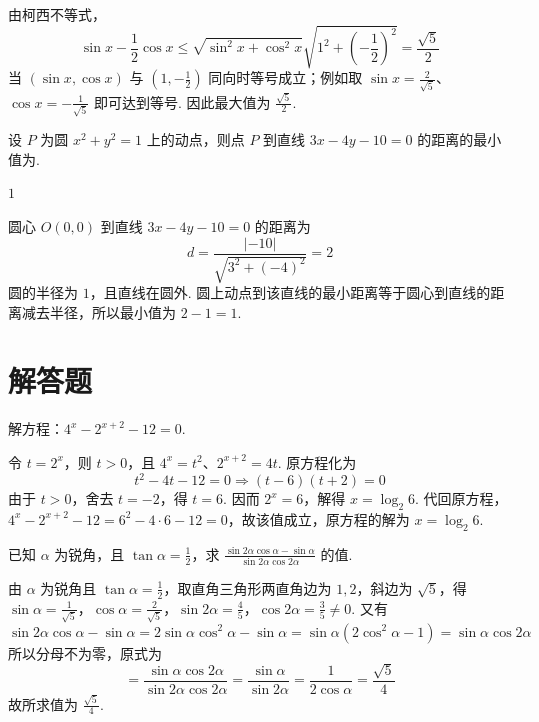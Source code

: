 \begin{solution}
由柯西不等式，
\[
\sin x-\frac12\cos x
\leqslant\sqrt{\sin^2x+\cos^2x}\sqrt{1^2+\left(-\frac12\right)^2}=\frac{\sqrt5}{2}
\]
当 \((\sin x,\cos x)\) 与 \(\left(1,-\frac12\right)\) 同向时等号成立；例如取 \(\sin x=\frac{2}{\sqrt5}\)、\(\cos x=-\frac{1}{\sqrt5}\) 即可达到等号. 因此最大值为 \(\frac{\sqrt5}{2}\).
\end{solution}

\begin{problem}
设 \(P\) 为圆 \(x^{2} + y^{2} = 1\) 上的动点，则点 \(P\) 到直线 \(3x - 4y - 10 = 0\) 的距离的最小值为\fillinblank{}.
\end{problem}

\begin{answer}
\(1\)
\end{answer}

\begin{solution}
圆心 \(O(0,0)\) 到直线 \(3x-4y-10=0\) 的距离为
\[
d=\frac{|{-10}|}{\sqrt{3^2+(-4)^2}}=2
\]
圆的半径为 \(1\)，且直线在圆外. 圆上动点到该直线的最小距离等于圆心到直线的距离减去半径，所以最小值为 \(2-1=1\).
\end{solution}

\section{解答题}
\begin{problem}
解方程：\(4^{x} - 2^{x + 2} - 12 = 0\).
\end{problem}

\begin{solution}
令 \(t=2^x\)，则 \(t>0\)，且 \(4^x=t^2\)、\(2^{x+2}=4t\). 原方程化为
\[
t^2-4t-12=0\Longrightarrow(t-6)(t+2)=0
\]
由于 \(t>0\)，舍去 \(t=-2\)，得 \(t=6\). 因而 \(2^x=6\)，解得 \(x=\log_2 6\). 代回原方程，\(4^x-2^{x+2}-12=6^2-4\cdot6-12=0\)，故该值成立，原方程的解为 \(x=\log_2 6\).
\end{solution}

\begin{problem}
已知 \(\alpha\) 为锐角，且 \(\tan \alpha = \frac{1}{2}\)，求 \(\frac{\sin 2\alpha \cos \alpha - \sin \alpha}{\sin 2\alpha \cos 2\alpha}\) 的值.
\end{problem}

\begin{solution}
由 \(\alpha\) 为锐角且 \(\tan\alpha=\frac12\)，取直角三角形两直角边为 \(1,2\)，斜边为 \(\sqrt5\)，得
\(\sin\alpha=\frac1{\sqrt5}\)，\(\cos\alpha=\frac2{\sqrt5}\)，\(\sin2\alpha=\frac45\)，\(\cos2\alpha=\frac35\ne0\).
又有
\[
\sin 2\alpha\cos\alpha - \sin\alpha
= 2\sin\alpha\cos^{2}\alpha - \sin\alpha
= \sin\alpha\left(2\cos^{2}\alpha - 1\right)
= \sin\alpha\cos 2\alpha
\]
所以分母不为零，原式为
\[
= \frac{\sin\alpha\cos 2\alpha}{\sin 2\alpha\cos 2\alpha}
= \frac{\sin\alpha}{\sin 2\alpha}
= \frac{1}{2\cos\alpha}
= \frac{\sqrt{5}}{4}
\]
故所求值为 \(\frac{\sqrt5}{4}\).
\end{solution}

